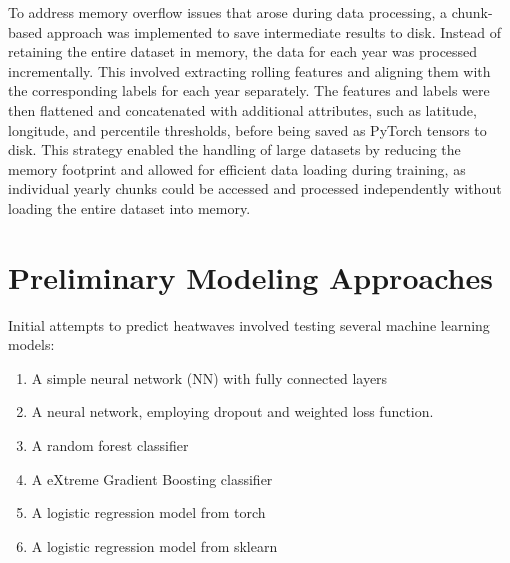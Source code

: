 \documentclass[conference,9pt]{IEEEtran}
\begin{document}
To address memory overflow issues that arose during data processing, a chunk-based approach was implemented to save intermediate results to disk. Instead of retaining the entire dataset in memory, the data for each year was processed incrementally. This involved extracting rolling features and aligning them with the corresponding labels for each year separately. The features and labels were then flattened and concatenated with additional attributes, such as latitude, longitude, and percentile thresholds, before being saved as PyTorch tensors to disk. This strategy enabled the handling of large datasets by reducing the memory footprint and allowed for efficient data loading during training, as individual yearly chunks could be accessed and processed independently without loading the entire dataset into memory.

\section{Preliminary Modeling Approaches}
Initial attempts to predict heatwaves involved testing several machine learning models:
\begin{enumerate}[1.]
    \item A simple neural network (NN) with fully connected layers
    \item A neural network, employing dropout and weighted loss function.
    \item A random forest classifier
    \item A eXtreme Gradient Boosting classifier
    \item A logistic regression model from torch
    \item A logistic regression model from sklearn
\end{enumerate}
\end{document}
